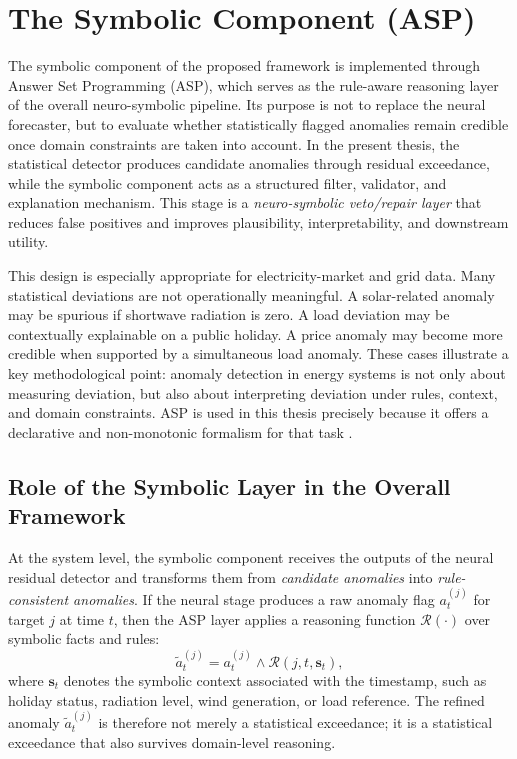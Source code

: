 \section{The Symbolic Component (ASP)}
\label{sec:symbolic_component_asp}

The symbolic component of the proposed framework is implemented through Answer Set Programming (ASP), which serves as the rule-aware reasoning layer of the overall neuro-symbolic pipeline. Its purpose is not to replace the neural forecaster, but to evaluate whether statistically flagged anomalies remain credible once domain constraints are taken into account. In the present thesis, the statistical detector produces candidate anomalies through residual exceedance, while the symbolic component acts as a structured filter, validator, and explanation mechanism. This stage is a \emph{neuro-symbolic veto/repair layer} that reduces false positives and improves plausibility, interpretability, and downstream utility.

This design is especially appropriate for electricity-market and grid data. Many statistical deviations are not operationally meaningful. A solar-related anomaly may be spurious if shortwave radiation is zero. A load deviation may be contextually explainable on a public holiday. A price anomaly may become more credible when supported by a simultaneous load anomaly. These cases illustrate a key methodological point: anomaly detection in energy systems is not only about measuring deviation, but also about interpreting deviation under rules, context, and domain constraints. ASP is used in this thesis precisely because it offers a declarative and non-monotonic formalism for that task \cite{gelfond1988stable,brewka2011asp,gebser2012answer,gebser2019multi}.

\subsection{Role of the Symbolic Layer in the Overall Framework}

At the system level, the symbolic component receives the outputs of the neural residual detector and transforms them from \emph{candidate anomalies} into \emph{rule-consistent anomalies}. If the neural stage produces a raw anomaly flag $a_t^{(j)}$ for target $j$ at time $t$, then the ASP layer applies a reasoning function $\mathcal{R}(\cdot)$ over symbolic facts and rules:
\begin{equation}
	\tilde{a}_t^{(j)} = a_t^{(j)} \wedge \mathcal{R}\!\left(j,t,\mathbf{s}_t\right),
	\label{eq:asp_refinement}
\end{equation}
where $\mathbf{s}_t$ denotes the symbolic context associated with the timestamp, such as holiday status, radiation level, wind generation, or load reference. The refined anomaly $\tilde{a}_t^{(j)}$ is therefore not merely a statistical exceedance; it is a statistical exceedance that also survives domain-level reasoning.

